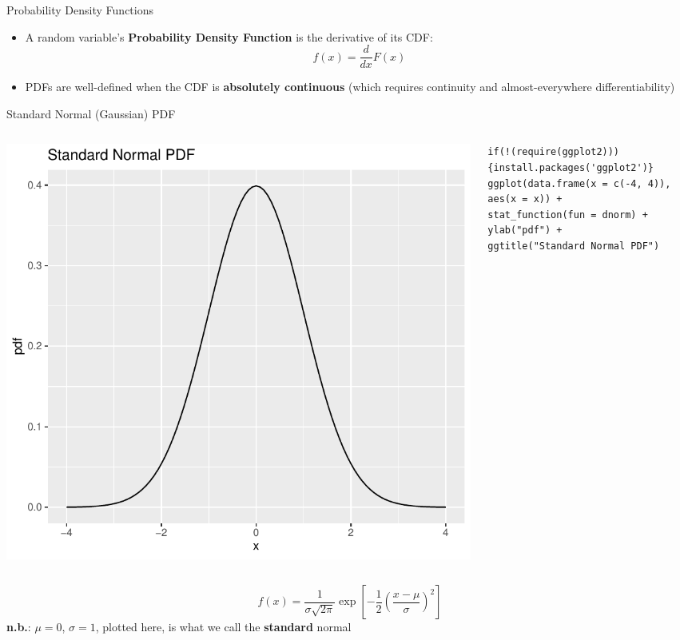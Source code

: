 \begin{frame}{Probability Density Functions}
\begin{itemize}
	\item A random variable's {\bf Probability Density Function} is the derivative of its CDF:
		\[
		 	f(x) = \frac{d}{dx}F(x)
		\]
		
	\medskip
	\item PDFs are well-defined when the CDF is {\bf absolutely continuous} (which requires continuity and almost-everywhere differentiability)
\end{itemize}
\end{frame}



\begin{frame}[fragile]{Standard Normal (Gaussian) PDF}
\begin{columns}
\begin{column}{0.5\textwidth}
\begin{center}
\includegraphics[height=.5\textheight]{normal-pdf} 
\end{center}
\end{column}
\begin{column}{0.5\textwidth} 
\begin{lstlisting}
if(!(require(ggplot2))){install.packages('ggplot2')}
ggplot(data.frame(x = c(-4, 4)), aes(x = x)) +
stat_function(fun = dnorm) + 
ylab("pdf") +
ggtitle("Standard Normal PDF") 
\end{lstlisting}
\end{column}
\end{columns}
\[
f\left(x\right) = \frac{1}{\sigma \sqrt{2 \pi}} \exp\left[ -\frac{1}{2}\left(\frac{x-\mu}{\sigma}\right)^2\right]
\]
{\bf n.b.}: $\mu=0$, $\sigma=1$, plotted here, is what we call the {\bf standard} normal
\end{frame}





